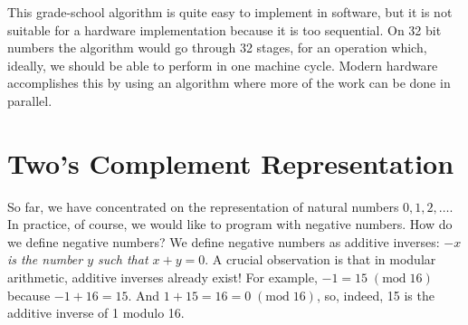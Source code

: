 This grade-school algorithm is quite easy to implement in software,
but it is not suitable for a hardware implementation because it is too
sequential.  On 32 bit numbers the algorithm would go through 32
stages, for an operation which, ideally, we should be able to perform
in one machine cycle.  Modern hardware accomplishes this by using an
algorithm where more of the work can be done in parallel.


\section{Two's Complement Representation}
\label{sec:ints:twos-complement}

So far, we have concentrated on the representation of natural numbers
$0, 1, 2, \ldots$.  In practice, of course, we would like to program
with negative numbers.  How do we define negative numbers?  We define
negative numbers as additive inverses: \emph{$-x$ is the number $y$ such
  that $x+y = 0$}.  A crucial observation is that in modular
arithmetic, additive inverses already exist!  For example,
$-1 = 15\;(\mathrm{mod}\; 16)$ because $-1 + 16 = 15$.  And
$1 + 15 = 16 = 0\;(\mathrm{mod}\; 16)$, so, indeed, 15 is the
additive inverse of 1 modulo 16.


